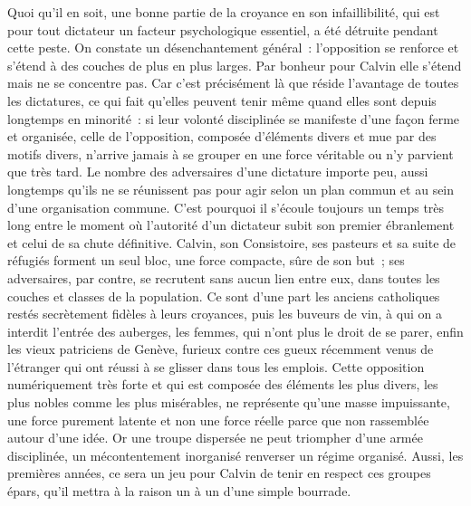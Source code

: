 \documentclass[french,twoside]{book} %
\newcommand{\astermono}{\medskip\centerline{\color{rubric}\large\selectfont{\syms ✻}}\medskip\par}%
\begin{document}
Quoi qu’il en soit, une bonne partie de la croyance en son infaillibilité, qui est pour tout dictateur un facteur psychologique essentiel, a été détruite pendant cette peste. On constate un désenchantement général : l’opposition se renforce et s’étend à des couches de plus en plus larges. Par bonheur pour Calvin elle s’étend mais ne se concentre pas. Car c’est précisément là que réside l’avantage de toutes les dictatures, ce qui fait qu’elles peuvent tenir même quand elles sont depuis longtemps en minorité : si leur volonté disciplinée se manifeste d’une façon ferme et organisée, celle de l’opposition, composée d’éléments divers et mue par des motifs divers, n’arrive jamais à se grouper en une force véritable ou n’y parvient que très tard. Le nombre des adversaires d’une dictature importe peu, aussi longtemps qu’ils ne se réunissent pas pour agir selon un plan commun et au sein d’une organisation commune. C’est pourquoi il s’écoule toujours un temps très long entre le moment où l’autorité d’un dictateur subit son premier ébranlement et celui de sa chute définitive. Calvin, son Consistoire, ses pasteurs et sa suite de réfugiés forment un seul bloc, une force compacte, sûre de son but ; ses adversaires, par contre, se recrutent sans aucun lien entre eux, dans toutes les couches et classes de la population. Ce sont d’une part les anciens catholiques restés secrètement fidèles à leurs croyances, puis les buveurs de vin, à qui on a interdit l’entrée des auberges, les femmes, qui n’ont plus le droit de se parer, enfin les vieux patriciens de Genève, furieux contre ces gueux récemment venus de l’étranger qui ont réussi à se glisser dans tous les emplois. Cette opposition numériquement très forte et qui est composée des éléments les plus divers, les plus nobles comme les plus misérables, ne représente qu’une masse impuissante, une force purement latente et non une force réelle parce que non rassemblée autour d’une idée. Or une troupe dispersée ne peut triompher d’une armée disciplinée, un mécontentement inorganisé renverser un régime organisé. Aussi, les premières années, ce sera un jeu pour Calvin de tenir en respect ces groupes épars, qu’il mettra à la raison un à un d’une simple bourrade.\par

\astermono
\end{document}
